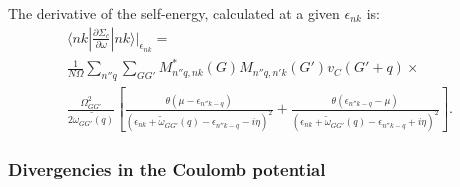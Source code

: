 \documentclass[11pt]{article}
\begin{document}
The derivative of the self-energy, calculated at a given $\epsilon_{nk}$ is:
\begin{multline}
\langle nk | \frac{\partial\Sigma_c}{\partial \omega} | nk \rangle |_{\epsilon_{nk}}= \\
\frac{1}{N\Omega} \sum_{n''q} \sum_{GG'}
M^*_{n''q,nk}(G) M_{n''q,n'k}(G')v_C(G'+q)
\times \\
\frac{\Omega^2_{GG'}}{2\tilde{\omega_{GG'}(q)}}[\frac{\theta(\mu-\epsilon_{n''k-q})}{(\epsilon_{nk}+\tilde{\omega}_{GG'}(q)-\epsilon_{n''k-q}-i\eta)^2}+
\frac{\theta(\epsilon_{n''k-q}-\mu)}{(\epsilon_{nk}+\tilde{\omega}_{GG'}(q)-\epsilon_{n''k-q}+i\eta)^2}].
\end{multline}


\subsubsection{Divergencies in the Coulomb potential}
\end{document}
